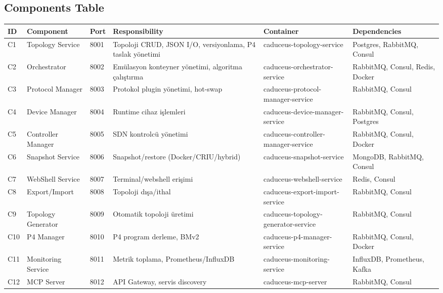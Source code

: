 \documentclass[10pt,a4paper]{article}
\begin{document}
\subsection{Components Table}

\begin{longtable}{p{0.8cm}p{3cm}p{1cm}p{5cm}p{3cm}p{3cm}}
\toprule
\textbf{ID} & \textbf{Component} & \textbf{Port} & \textbf{Responsibility} & \textbf{Container} & \textbf{Dependencies} \\
\midrule
\endhead

C1 & Topology Service & 8001 & Topoloji CRUD, JSON I/O, versiyonlama, P4 taslak yönetimi & caduceus-topology-service & Postgres, RabbitMQ, Consul \\ \midrule
C2 & Orchestrator & 8002 & Emülasyon konteyner yönetimi, algoritma çalıştırma & caduceus-orchestrator-service & RabbitMQ, Consul, Redis, Docker \\ \midrule
C3 & Protocol Manager & 8003 & Protokol plugin yönetimi, hot-swap & caduceus-protocol-manager-service & RabbitMQ, Consul \\ \midrule
C4 & Device Manager & 8004 & Runtime cihaz işlemleri & caduceus-device-manager-service & RabbitMQ, Consul, Postgres \\ \midrule
C5 & Controller Manager & 8005 & SDN kontrolcü yönetimi & caduceus-controller-manager-service & RabbitMQ, Consul, Docker \\ \midrule
C6 & Snapshot Service & 8006 & Snapshot/restore (Docker/CRIU/hybrid) & caduceus-snapshot-service & MongoDB, RabbitMQ, Consul \\ \midrule
C7 & WebShell Service & 8007 & Terminal/webshell erişimi & caduceus-webshell-service & Redis, Consul \\ \midrule
C8 & Export/Import & 8008 & Topoloji dışa/ithal & caduceus-export-import-service & RabbitMQ, Consul \\ \midrule
C9 & Topology Generator & 8009 & Otomatik topoloji üretimi & caduceus-topology-generator-service & RabbitMQ, Consul \\ \midrule
C10 & P4 Manager & 8010 & P4 program derleme, BMv2 & caduceus-p4-manager-service & RabbitMQ, Consul, Docker \\ \midrule
C11 & Monitoring Service & 8011 & Metrik toplama, Prometheus/InfluxDB & caduceus-monitoring-service & InfluxDB, Prometheus, Kafka \\ \midrule
C12 & MCP Server & 8012 & API Gateway, servis discovery & caduceus-mcp-server & RabbitMQ, Consul \\ \midrule

\end{longtable}
\end{document}
